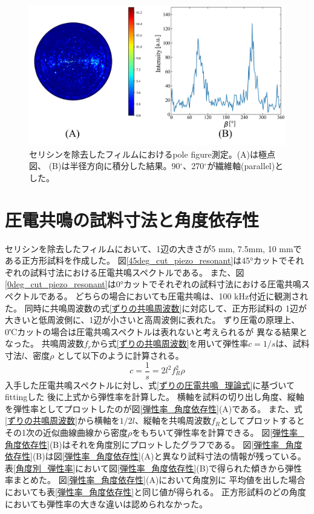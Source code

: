 \documentclass[dvipdfmx,12pt,a4paper]{jreport}
\begin{document}
			\begin{figure}[h]
				\centering
				\includegraphics[width=\linewidth]{pole_figure_silk_fibroin.jpg}
				\caption{セリシンを除去したフィルムにおけるpole figure測定。(A)は極点図、
				(B)は半径方向に積分した結果。90$^{\circ}$、270$^{\circ}$が繊維軸(parallel)とした。}
				\label{極点図_結果_without_sericin}
			\end{figure}
			\newpage
			\section{圧電共鳴の試料寸法と角度依存性}
			セリシンを除去したフィルムにおいて、1辺の大きさが5 mm, 7.5mm, 10 mmである正方形試料を作成した。
			図\ref{45deg_cut_piezo_resonant}は45°カットでそれぞれの試料寸法における圧電共鳴スペクトルである。
			また、図\ref{0deg_cut_piezo_resonant}は0°カットでそれぞれの試料寸法における圧電共鳴スペクトルである。
			どちらの場合においても圧電共鳴は、100 kHz付近に観測された。
			同時に共鳴周波数の式\ref{ずりの共鳴周波数}に対応して、正方形試料の
			1辺が大きいと低周波側に、1辺が小さいと高周波側に表れた。
			ずり圧電の原理上、0℃カットの場合は圧電共鳴スペクトルは表れないと考えられるが
			異なる結果となった。
			共鳴周波数$f_r$から式\ref{ずりの共鳴周波数}を用いて弾性率$c=1/s$は、試料寸法$l$、密度$\rho$
			として以下のように計算される。
			\begin{equation}
				c = \frac{1}{s} = 2l^2 f_R^2 \rho
			\end{equation}
			入手した圧電共鳴スペクトルに対し、式\ref{ずりの圧電共鳴_理論式}に基づいてfittingした
			後に上式から弾性率を計算した。
			横軸を試料の切り出し角度、縦軸を弾性率としてプロットしたのが図\ref{弾性率_角度依存性}(A)である。
			また、式\ref{ずりの共鳴周波数}から横軸を$1/2l$、縦軸を共鳴周波数$f_R$としてプロットすると
			その1次の近似曲線曲線から密度$\rho$をもちいて弾性率を計算できる。
			図\ref{弾性率_角度依存性}(B)はそれを角度別にプロットしたグラフである。
			図\ref{弾性率_角度依存性}(B)は図\ref{弾性率_角度依存性}(A)と異なり試料寸法の情報が残っている。
			表\ref{角度別_弾性率}において図\ref{弾性率_角度依存性}(B)で得られた傾きから弾性率まとめた。
			図\ref{弾性率_角度依存性}(A)において角度別に
			平均値を出した場合においても表\ref{弾性率_角度依存性}と同じ値が得られる。
			正方形試料のどの角度においても弾性率の大きな違いは認められなかった。
\end{document}
